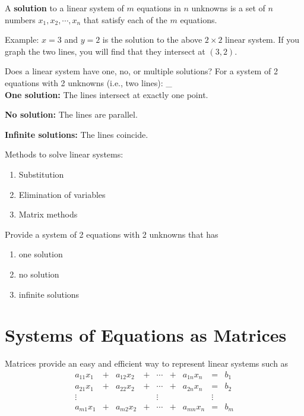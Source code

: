 \documentclass[]{book}
\providecommand{\tightlist}{%
  \setlength{\itemsep}{0pt}\setlength{\parskip}{0pt}}
\theoremstyle{definition}
\theoremstyle{definition}
\theoremstyle{definition}
\theoremstyle{remark}
\let\BeginKnitrBlock\begin \let\EndKnitrBlock\end
\begin{document}
A \textbf{solution} to a linear system of \(m\) equations in \(n\)
unknowns is a set of \(n\) numbers \(x_1, x_2, \cdots, x_n\) that
satisfy each of the \(m\) equations.

Example: \(x=3\) and \(y=2\) is the solution to the above \(2\times 2\)
linear system. If you graph the two lines, you will find that they
intersect at \((3,2)\).

Does a linear system have one, no, or multiple solutions? For a system
of 2 equations with 2 unknowns (i.e., two lines): \_\\
\textbf{One solution:} The lines intersect at exactly one point.

\textbf{No solution:} The lines are parallel.

\textbf{Infinite solutions:} The lines coincide.

Methods to solve linear systems:

\begin{enumerate}
\def\labelenumi{\arabic{enumi}.}
\tightlist
\item
  Substitution
\item
  Elimination of variables
\item
  Matrix methods
\end{enumerate}

\BeginKnitrBlock{exercise}[Linear Equations]
\protect\hypertarget{exr:lineareq}{}{\label{exr:lineareq} {} }

Provide a system of 2 equations with 2 unknowns that has

\begin{enumerate}
\def\labelenumi{\arabic{enumi}.}
\item
  one solution
\item
  no solution
\item
  infinite solutions
\end{enumerate}
\EndKnitrBlock{exercise}

\section{Systems of Equations as
Matrices}\label{systems-of-equations-as-matrices}

Matrices provide an easy and efficient way to represent linear systems
such as \[\begin{matrix}
        a_{11}x_1  & + & a_{12}x_2 & + & \cdots & + & a_{1n}x_n & = & b_1\\
        a_{21}x_1  & + & a_{22}x_2 & + & \cdots & + & a_{2n}x_n & = & b_2\\
        \vdots     &   &     &   & \vdots &   &     & \vdots & \\
        a_{m1}x_1  & + & a_{m2}x_2 & + & \cdots & + & a_{mn}x_n & = & b_m
        \end{matrix}\]
\end{document}
